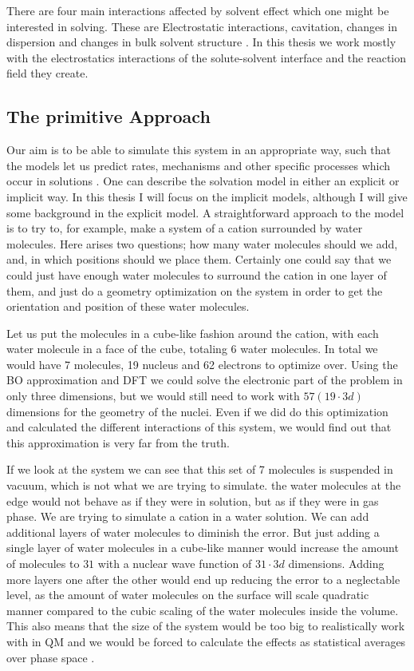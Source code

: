 \documentclass[../master_thesis.tex]{subfiles}
\begin{document}
There are four main interactions affected by solvent effect which one might be
interested in solving. These are Electrostatic interactions, cavitation,
changes in dispersion and changes in bulk solvent structure \cite{Cramer:2004}.
In this thesis we work mostly with the electrostatics interactions of the
solute-solvent interface and the reaction field they create.

\subsection{The primitive Approach}
Our aim is to be able to simulate this system in an appropriate way, such that
the models let us predict rates, mechanisms and other specific processes which
occur in solutions \cite{Tomasi:1994wt}.
One can describe the solvation model in either an explicit or implicit way. In
this thesis I will focus on the implicit models, although I will give some
background in the explicit model.
A straightforward approach to the model is to try to, for example, make a
system of a  cation surrounded by water molecules. Here arises two
questions; how many water molecules should we add, and, in which positions
should we place them. Certainly one could say that we could just have enough
water molecules to surround the cation in one layer of them,  and just do a
geometry optimization \cite{Jensen:2017} on the system in order to get the
orientation and position of these water molecules.

Let us put the molecules in a cube-like fashion around the cation, with each
water molecule in a face of the cube, totaling 6 water molecules. In total we
would have 7 molecules, 19 nucleus and 62 electrons to optimize over. Using the
\ac{BO} approximation and \ac{DFT} we could solve the electronic part of the
problem in only three dimensions, but we would still need to work with
$57 (19\cdot3d)$ dimensions for the geometry of the nuclei. Even if we did do this
optimization and calculated the different interactions of this system, we would
find out that this approximation is very far from the truth.

If we look at the system we can see that this set of 7 molecules is suspended in
vacuum, which is not what we are trying to simulate. the water molecules at
the edge would not behave as if they were in solution, but as if they were in
gas phase. We are trying to simulate a  cation in a water solution.
We can add additional layers of water molecules to diminish the error. But
just adding a single layer of water molecules in a cube-like manner would
increase the amount of molecules to $31$ with a nuclear wave function of
$31\cdot3d$ dimensions. Adding more layers one after the other would end up
reducing the error to a neglectable level, as the amount of water molecules on
the surface will scale quadratic manner compared to the cubic scaling of the
water molecules inside the volume. This also means that the size of the system
would be too big to realistically work with in \ac{QM} and we would be forced to
calculate the effects as statistical averages over phase space
\cite{Cramer:2004}.
\end{document}
